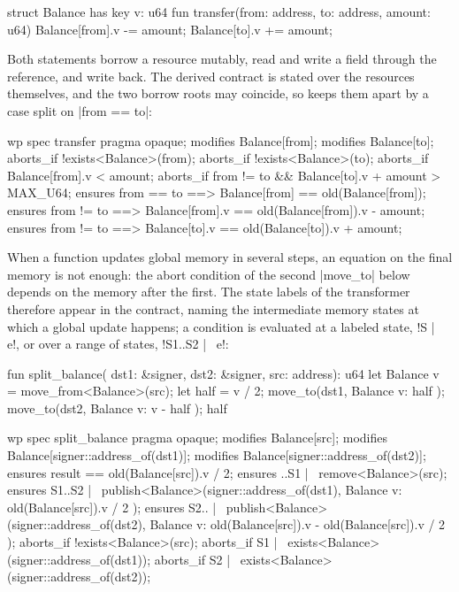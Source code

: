 \begin{MoveBoxUser}
  struct Balance has key { v: u64 }
  fun transfer(from: address, to: address, amount: u64) {
    Balance[from].v -= amount;
    Balance[to].v += amount;
  }
\end{MoveBoxUser}

\noindent Both statements borrow a resource mutably, read and write a field through the reference, and write back.
The derived contract is stated over the resources themselves, and the two borrow roots may coincide, so \WP keeps them apart by a case split on |from == to|:

\begin{MoveBoxTool}{wp}
  spec transfer {
    pragma opaque;
    modifies Balance[from];
    modifies Balance[to];
    aborts_if !exists<Balance>(from);
    aborts_if !exists<Balance>(to);
    aborts_if Balance[from].v < amount;
    aborts_if
      from != to && Balance[to].v + amount > MAX_U64;
    ensures
      from == to ==> Balance[from] == old(Balance[from]);
    ensures from != to
      ==> Balance[from].v == old(Balance[from]).v - amount;
    ensures from != to
      ==> Balance[to].v == old(Balance[to]).v + amount;
  }
\end{MoveBoxTool}

\noindent When a function updates global memory in several steps, an equation on the final memory is not enough: the abort condition of the second |move_to| below depends on the memory after the first.
The state labels of the transformer therefore appear in the contract, naming the intermediate memory states at which a global update happens; a condition is evaluated at a labeled state, !S |~ e!, or over a range of states, !S1..S2 |~ e!:

\begin{MoveBoxUser}
  fun split_balance(
      dst1: &signer, dst2: &signer, src: address): u64 {
    let Balance { v } = move_from<Balance>(src);
    let half = v / 2;
    move_to(dst1, Balance { v: half });
    move_to(dst2, Balance { v: v - half });
    half
  }
\end{MoveBoxUser}
\begin{MoveBoxTool}{wp}
  spec split_balance {
    pragma opaque;
    modifies Balance[src];
    modifies Balance[signer::address_of(dst1)];
    modifies Balance[signer::address_of(dst2)];
    ensures result == old(Balance[src]).v / 2;
    ensures ..S1 |~ remove<Balance>(src);
    ensures S1..S2 |~
      publish<Balance>(signer::address_of(dst1),
        Balance { v: old(Balance[src]).v / 2 });
    ensures S2.. |~
      publish<Balance>(signer::address_of(dst2),
        Balance { v: old(Balance[src]).v
                     - old(Balance[src]).v / 2 });
    aborts_if !exists<Balance>(src);
    aborts_if
      S1 |~ exists<Balance>(signer::address_of(dst1));
    aborts_if
      S2 |~ exists<Balance>(signer::address_of(dst2));
  }
\end{MoveBoxTool}

